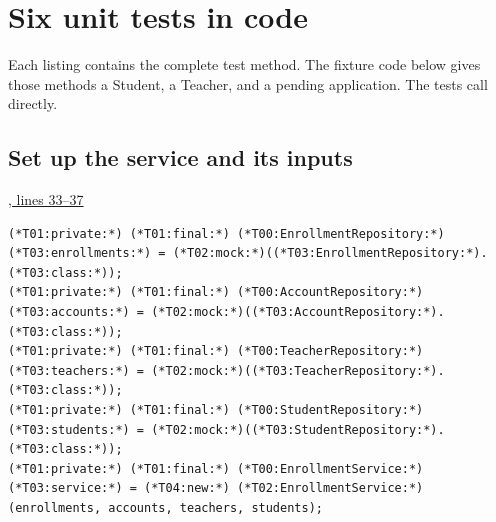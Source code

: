 \clearpage
\section{Six unit tests in code}\label{sec:unitcode}
Each listing contains the complete test method. The fixture code below gives
those methods a Student, a Teacher, and a pending application. The tests call
 directly.

\subsection{Set up the service and its inputs}
\par\smallskip
{\small\href{\repo/blob/5d22aed7f6d4ef1e4c0b0c0dabf2962ba4b47608/src/test/java/com/example/fmschool/EnrollmentServiceUnitTests.java#L33-L37}{, lines 33--37}}
\begin{lstlisting}[style=vsJava,firstnumber=33]
(*T01:private:*) (*T01:final:*) (*T00:EnrollmentRepository:*) (*T03:enrollments:*) = (*T02:mock:*)((*T03:EnrollmentRepository:*).(*T03:class:*));
(*T01:private:*) (*T01:final:*) (*T00:AccountRepository:*) (*T03:accounts:*) = (*T02:mock:*)((*T03:AccountRepository:*).(*T03:class:*));
(*T01:private:*) (*T01:final:*) (*T00:TeacherRepository:*) (*T03:teachers:*) = (*T02:mock:*)((*T03:TeacherRepository:*).(*T03:class:*));
(*T01:private:*) (*T01:final:*) (*T00:StudentRepository:*) (*T03:students:*) = (*T02:mock:*)((*T03:StudentRepository:*).(*T03:class:*));
(*T01:private:*) (*T01:final:*) (*T00:EnrollmentService:*) (*T03:service:*) = (*T04:new:*) (*T02:EnrollmentService:*)(enrollments, accounts, teachers, students);
\end{lstlisting}

